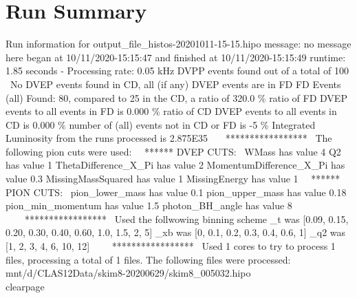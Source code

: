 \documentclass{article}
\begin{document}
\section{Run Summary}

	Run information for output\_file\_histos-20201011-15-15.hipo 
 \Run message: no message here  
 \Script began at 10/11/2020-15:15:47 and finished at 10/11/2020-15:15:49
 \total runtime: 1.85 seconds - Processing rate: 0.05 kHz 
 \No DVPP events found out of a total of 100 
 \ No DVEP events found in CD, all (if any) DVEP events are in FD 
 \Global FD Events (all) Found: 80, compared to 25 in the CD, a ratio of 320.0 \%
 \The ratio of FD DVEP events to all events in FD is  0.000 \%
 \The ratio of CD DVEP events to all events in CD is  0.000 \%
 \The number of (all) events not in CD or FD is  -5 \%
 \Total Integrated Luminosity from the runs processed is 2.875E35 
 \
 \ 
 \
 \****************** 
 \ The following pion cuts were used: 
 \
 \ ****** DVEP CUTS: 
 \ 
 \Cut WMass has value 4 
 \Cut Q2 has value 1 
 \Cut ThetaDifference\_X\_Pi has value 2 
 \Cut MomentumDifference\_X\_Pi has value 0.3 
 \Cut MissingMassSquared has value 1 
 \Cut MissingEnergy has value 1 
 \
 \ ****** PION CUTS: 
 \ 
 \Cut pion\_lower\_mass has value 0.1 
 \Cut pion\_upper\_mass has value 0.18 
 \Cut pion\_min\_momentum has value 1.5 
 \Cut photon\_BH\_angle has value 8 
 \
 \ 
 \ 
 \ ***************** 
 \ Used the follwowing binning scheme 
 \binning\_t was [0.09, 0.15, 0.20, 0.30, 0.40, 0.60, 1.0, 1.5, 2, 5] 
 \binning\_xb was [0, 0.1, 0.2, 0.3, 0.4, 0.6, 1] 
 \binning\_q2 was [1, 2, 3, 4, 6, 10, 12] 
 \
 \ 
 \ 
 \ ***************** 
 \ Used 1 cores to try to process 1 files, processing a total of 1 files. The following files were processed: 
 \/mnt/d/CLAS12Data/skim8-20200629/skim8\_005032.hipo 
 \\clearpage 
\listoffigures
\clearpage
\end{document}
